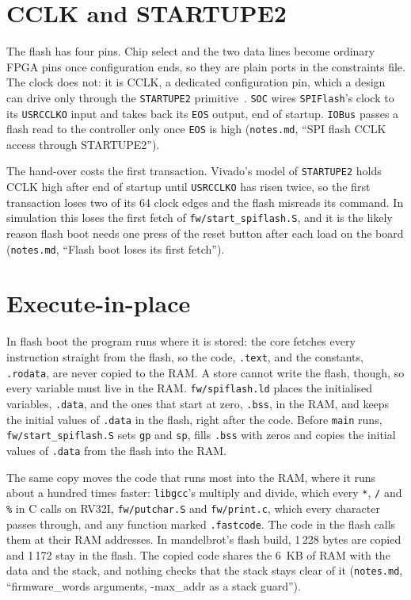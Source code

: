 \documentclass[11pt,a4paper]{report}
\newcommand{\notes}[1]{(\texttt{notes.md}, ``#1'')}
\begin{document}
\section{CCLK and STARTUPE2}
\label{sec:cclk}

The flash has four pins. Chip select and the two data lines become ordinary FPGA pins once
configuration ends, so they are plain ports in the constraints file. The clock does not: it
is CCLK, a dedicated configuration pin, which a design can drive only through the
\texttt{STARTUPE2} primitive~\cite{ug470}. \texttt{SOC} wires \texttt{SPIFlash}'s clock to
its \texttt{USRCCLKO} input and takes back its \texttt{EOS} output, end of startup.
\texttt{IOBus} passes a flash read to the controller only once \texttt{EOS} is high
\notes{SPI flash CCLK access through STARTUPE2}.

The hand-over costs the first transaction. Vivado's model of \texttt{STARTUPE2} holds CCLK
high after end of startup until \texttt{USRCCLKO} has risen twice, so the first transaction
loses two of its 64 clock edges and the flash misreads its command. In simulation this loses
the first fetch of \texttt{fw/start\_spiflash.S}, and it is the likely reason flash boot
needs one press of the reset button after each load on the board \notes{Flash boot loses its
first fetch}.

\section{Execute-in-place}
\label{sec:xip}

In flash boot the program runs where it is stored: the core fetches every instruction straight
from the flash, so the code, \texttt{.text}, and the constants, \texttt{.rodata}, are never
copied to the RAM. A store cannot write the flash, though, so every variable must live in the
RAM. \texttt{fw/spiflash.ld} places the initialised variables, \texttt{.data}, and the ones
that start at zero, \texttt{.bss}, in the RAM, and keeps the initial values of \texttt{.data}
in the flash, right after the code. Before \texttt{main} runs, \texttt{fw/start\_spiflash.S}
sets \texttt{gp} and \texttt{sp}, fills \texttt{.bss} with zeros and copies the initial
values of \texttt{.data} from the flash into the RAM.

The same copy moves the code that runs most into the RAM, where it runs about a hundred
times faster: \texttt{libgcc}'s multiply and divide, which every \texttt{*}, \texttt{/} and
\texttt{\%} in C calls on RV32I, \texttt{fw/putchar.S} and \texttt{fw/print.c}, which every
character passes through, and any function marked \texttt{.fastcode}. The code in the flash
calls them at their RAM addresses. In mandelbrot's flash build, 1\,228 bytes are copied and
1\,172 stay in the flash. The copied code shares the 6~KB of RAM with the data and the stack,
and nothing checks that the stack stays clear of it \notes{firmware\_words arguments,
-max\_addr as a stack guard}.
\end{document}
